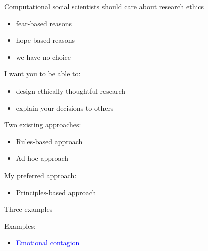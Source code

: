 \documentclass{beamer}
\begin{document}
\begin{frame}

Computational social scientists should care about research ethics
\pause
\begin{itemize}
\item fear-based reasons
\pause
\item hope-based reasons
\pause
\item we have no choice
\end{itemize}

\end{frame}
\begin{frame}

I want you to be able to:
\begin{itemize}
\item design ethically thoughtful research
\pause 
\item explain your decisions to others
\end{itemize}
 
\end{frame}
%
%
\begin{frame}

Two existing approaches:
\begin{itemize}
\item Rules-based approach
\pause
\item Ad hoc approach
\end{itemize}
\pause
My preferred approach:
\begin{itemize}
\item Principles-based approach
\end{itemize}

\end{frame}
\begin{frame}

\begin{center}
\Large{Three examples}
\end{center}

\end{frame}
\begin{frame}

Examples:
\begin{itemize}
\item \textcolor{blue}{Emotional contagion}
\end{itemize}

\end{frame}
\end{document}
